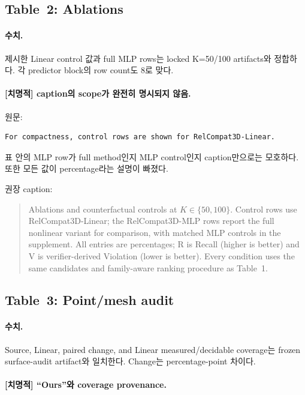 \documentclass[11pt]{article}
\newcommand{\fatal}{\textbf{\textcolor{fatalred}{[치명적]}}}
\begin{document}
\subsection{Table~2: Ablations}

\paragraph{수치.}

제시한 Linear control 값과 full MLP rows는 locked K=50/100 artifacts와 정합하다.
각 predictor block의 row count도 8로 맞다.

\paragraph{\fatal{} caption의 scope가 완전히 명시되지 않음.}

원문:
\begin{verbatim}
For compactness, control rows are shown for RelCompat3D-Linear.
\end{verbatim}

표 안의 MLP row가 full method인지 MLP control인지 caption만으로는 모호하다. 또한
모든 값이 percentage라는 설명이 빠졌다.

권장 caption:
\begin{quote}
Ablations and counterfactual controls at $K\in\{50,100\}$. Control rows use
RelCompat3D-Linear; the RelCompat3D-MLP rows report the full nonlinear variant
for comparison, with matched MLP controls in the supplement. All entries are
percentages; R is Recall (higher is better) and V is verifier-derived Violation
(lower is better). Every condition uses the same candidates and family-aware
ranking procedure as Table~1.
\end{quote}

\subsection{Table~3: Point/mesh audit}

\paragraph{수치.}

Source, Linear, paired change, and Linear measured/decidable coverage는 frozen
surface-audit artifact와 일치한다. Change는 percentage-point 차이다.

\paragraph{\fatal{} ``Ours''와 coverage provenance.}
\end{document}

